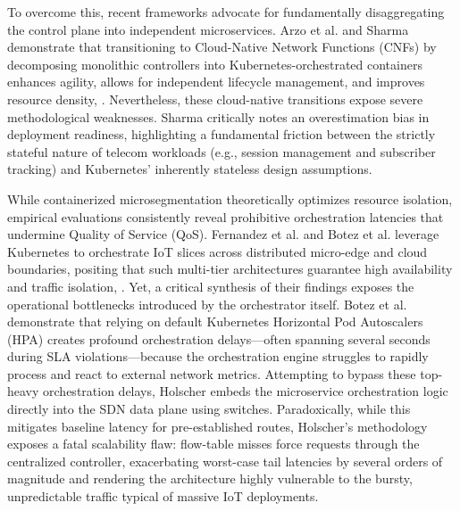 To overcome this, recent frameworks advocate for fundamentally disaggregating the control plane into independent microservices. Arzo et al. and Sharma demonstrate that transitioning to Cloud-Native Network Functions (CNFs) by decomposing monolithic controllers into Kubernetes-orchestrated containers enhances agility, allows for independent lifecycle management, and improves resource density\cite{b8}, \cite{b10}. Nevertheless, these cloud-native transitions expose severe methodological weaknesses. Sharma critically notes an overestimation bias in deployment readiness, highlighting a fundamental friction between the strictly stateful nature of telecom workloads (e.g., session management and subscriber tracking) and Kubernetes' inherently stateless design assumptions\cite{b10}.

While containerized microsegmentation theoretically optimizes resource isolation, empirical evaluations consistently reveal prohibitive orchestration latencies that undermine Quality of Service (QoS). Fernandez et al. and Botez et al. leverage Kubernetes to orchestrate IoT slices across distributed micro-edge and cloud boundaries, positing that such multi-tier architectures guarantee high availability and traffic isolation\cite{b20}, \cite{b21}. Yet, a critical synthesis of their findings exposes the operational bottlenecks introduced by the orchestrator itself. Botez et al. demonstrate that relying on default Kubernetes Horizontal Pod Autoscalers (HPA) creates profound orchestration delays---often spanning several seconds during SLA violations---because the orchestration engine struggles to rapidly process and react to external network metrics\cite{b20}. Attempting to bypass these top-heavy orchestration delays, Holscher embeds the microservice orchestration logic directly into the SDN data plane using switches\cite{b21}. Paradoxically, while this mitigates baseline latency for pre-established routes, Holscher's methodology exposes a fatal scalability flaw: flow-table misses force requests through the centralized controller, exacerbating worst-case tail latencies by several orders of magnitude and rendering the architecture highly vulnerable to the bursty, unpredictable traffic typical of massive IoT deployments\cite{b21}.


